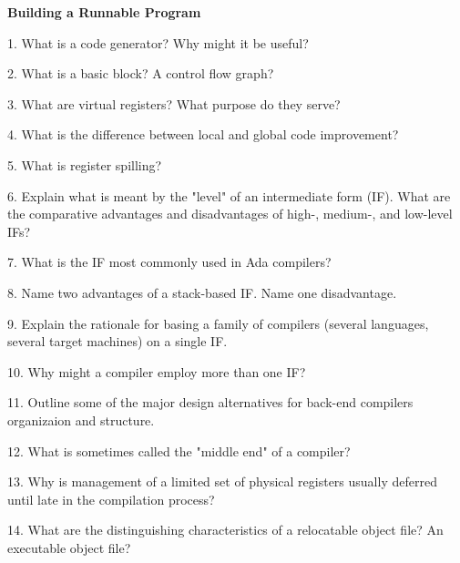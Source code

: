 \centerline{\bf Building a Runnable Program}

\vskip 1cm

1. What is a code generator? Why might it be useful?

\filbreak
\vskip 1cm

2. What is a basic block? A control flow graph?

\filbreak
\vskip 1cm

3. What are virtual registers? What purpose do they serve?

\filbreak
\vskip 1cm

4. What is the difference between local and global code improvement?

\filbreak
\vskip 1cm

5. What is register spilling?

\filbreak
\vskip 1cm

6. Explain what is meant by the "level" of an intermediate form (IF). What are the comparative advantages and disadvantages of high-, medium-, and low-level IFs?

\filbreak
\vskip 1cm

7. What is the IF most commonly used in Ada compilers?

\filbreak
\vskip 1cm

8. Name two advantages of a stack-based IF. Name one disadvantage.

\filbreak
\vskip 1cm

9. Explain the rationale for basing a family of compilers (several languages, several target machines) on a single IF.

\filbreak
\vskip 1cm

10. Why might a compiler employ more than one IF?

\filbreak
\vskip 1cm

11. Outline some of the major design alternatives  for back-end compilers organizaion and structure.

\filbreak
\vskip 1cm

12. What is sometimes called the "middle end" of a compiler?

\filbreak
\vskip 1cm

13. Why is management of a limited set of physical registers usually deferred until late in the compilation process?

\filbreak
\vskip 1cm

14. What are the distinguishing characteristics of a relocatable object file? An executable object file?

